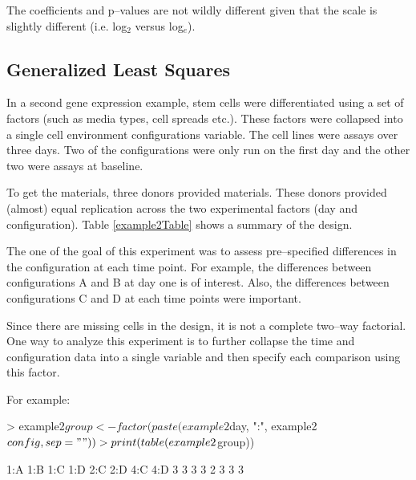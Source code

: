 \documentclass[12pt]{article}
\renewenvironment{Schunk}{\vspace{\topsep}}{\vspace{\topsep}}
\begin{document}
The coefficients and p--values are not wildly different given that the scale is slightly different (i.e. log$_2$ versus log$_e$).



\subsection{Generalized Least Squares}

In a second gene expression example, stem cells were differentiated using a set of factors (such as media types, cell spreads etc.). These factors were collapsed into a single cell environment configurations variable. The cell lines were assays over three days. Two of the configurations were only run on the first day and the other two were assays at baseline. 

To get the materials, three donors provided materials. These donors provided (almost) equal replication across the two experimental factors (day and configuration). Table \ref{example2Table} shows a summary of the design.


%

The one of the goal of this experiment was to assess pre--specified differences in the configuration at each time point. For example, the differences between configurations A and B at day one is of interest. Also, the differences between configurations C and D at each time points were important.

Since there are missing cells in the design, it is not a complete two--way factorial. One way to analyze this experiment is to further collapse the time and configuration data into a single variable and then specify each comparison using this factor.

For example:
\begin{Schunk}
\begin{Sinput}
> example2$group <- factor(paste(example2$day, ":", example2$config, sep = ""))
> print(table(example2$group))
\end{Sinput}
\begin{Soutput}
1:A 1:B 1:C 1:D 2:C 2:D 4:C 4:D 
  3   3   3   3   2   3   3   3 
\end{Soutput}
\end{Schunk}
\end{document}
